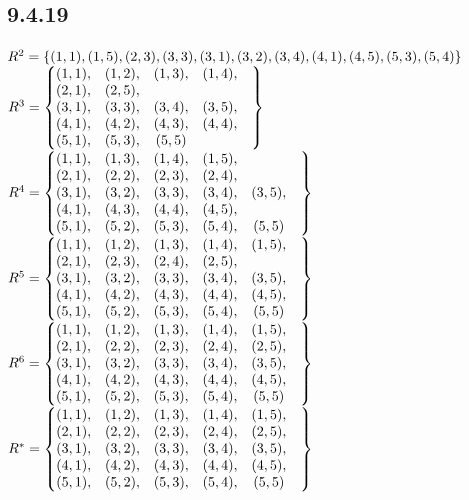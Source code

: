\documentclass[12pt,titlepage]{extarticle}
\begin{document}
\subsection*{9.4.19}
\begin{tasks}
    \task $R^2 = \qty{
        (1,1), (1,5),
        (2,3),
        (3,3), (3,1), (3,2), (3,4),
        (4,1), (4,5),
        (5,3), (5,4)
    }$
    \task $R^3 = \left\{\mqty{
        (1, 1),& (1, 2),& (1, 3),& (1, 4),& \\
        (2, 1),& (2, 5),& \\
        (3, 1),& (3, 3),& (3, 4),& (3, 5),&  \\
        (4, 1),& (4, 2),& (4, 3),& (4, 4),& \\
        (5, 1),& (5, 3),& (5, 5)
    }\right\}$
    \task $R^4 = \left\{\mqty{
        (1, 1),& (1, 3),& (1, 4),& (1, 5),&  \\
        (2, 1),& (2, 2),& (2, 3),& (2, 4),& \\
        (3, 1),& (3, 2),& (3, 3),& (3, 4),& (3, 5),& \\
        (4, 1),& (4, 3),& (4, 4),& (4, 5),& \\
        (5, 1),& (5, 2),& (5, 3),& (5, 4),& (5, 5)
    }\right\}$
    \task $R^5 = \left\{\mqty{
        (1, 1),& (1, 2),& (1, 3),& (1, 4),& (1, 5),& \\
        (2, 1),& (2, 3),& (2, 4),& (2, 5),& \\
        (3, 1),& (3, 2),& (3, 3),& (3, 4),& (3, 5),& \\
        (4, 1),& (4, 2),& (4, 3),& (4, 4),& (4, 5),& \\
        (5, 1),& (5, 2),& (5, 3),& (5, 4),& (5, 5)
    }\right\}$
    \task $R^6 = \left\{\mqty{
        (1, 1),& (1, 2),& (1, 3),& (1, 4),& (1, 5),& \\
        (2, 1),& (2, 2),& (2, 3),& (2, 4),& (2, 5),& \\
        (3, 1),& (3, 2),& (3, 3),& (3, 4),& (3, 5),& \\
        (4, 1),& (4, 2),& (4, 3),& (4, 4),& (4, 5),& \\
        (5, 1),& (5, 2),& (5, 3),& (5, 4),& (5, 5)
    }\right\}$
    \task $R^* = \left\{\mqty{
        (1, 1),& (1, 2),& (1, 3),& (1, 4),& (1, 5),& \\
        (2, 1),& (2, 2),& (2, 3),& (2, 4),& (2, 5),& \\
        (3, 1),& (3, 2),& (3, 3),& (3, 4),& (3, 5),& \\
        (4, 1),& (4, 2),& (4, 3),& (4, 4),& (4, 5),& \\
        (5, 1),& (5, 2),& (5, 3),& (5, 4),& (5, 5)
    }\right\}$
\end{tasks}
\end{document}
